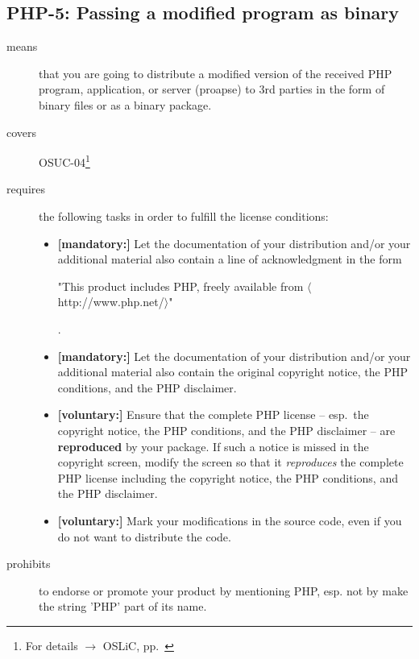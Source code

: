 \subsection{PHP-5: Passing a modified program as binary}

\begin{description}
\item[means] that you are going to distribute a modified version of the received
PHP pro\-gram, application, or server (proapse) to 3rd parties in the form of
binary files or as a binary package.
\item[covers] OSUC-04\footnote{For details $\rightarrow$ OSLiC, pp.\ \pageref{OSUC-04-DEF}}
\item[requires] the following tasks in order to fulfill the license conditions:
\begin{itemize}
  
  \item \textbf{[mandatory:]} Let the documentation of your distribution and/or
  your additional material also contain a line of acknowledgment in the form
  \begin{footnotesize}"This product includes PHP, freely available from
  $\langle$http://www.php.net/$\rangle$"\end{footnotesize}.
    
  \item \textbf{[mandatory:]} Let the documentation of your distribution and/or
  your additional material also contain the original copyright notice, the PHP
  conditions, and the PHP disclaimer.

  \item \textbf{[voluntary:]} Ensure that the complete PHP license -- esp.\ the
  copyright notice, the PHP conditions, and the PHP disclaimer -- are
  \textbf{reproduced} by your package. If such a notice is missed in the
  copyright screen, modify the screen so  that it \emph{reproduces} the complete
  PHP license including the copyright notice, the PHP conditions, and the PHP
  disclaimer.
  
  \item \textbf{[voluntary:]} Mark your modifications in the source code,
  even if you do not want to distribute the code.

\end{itemize}

\item[prohibits] to endorse or promote your product by mentioning PHP, esp. not
by make the string 'PHP' part of its name.

\end{description}

